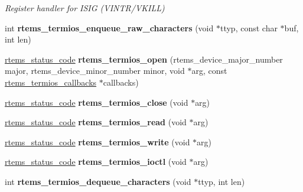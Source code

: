 \begin{DoxyCompactItemize}
\begin{DoxyCompactList}\small\item\em Register handler for I\+S\+IG (V\+I\+N\+T\+R/\+V\+K\+I\+LL) \end{DoxyCompactList}\item 
\mbox{\label{group__Termios_ga578fc70ca70d5cf49aebd7b75328e577}} 
int {\bfseries rtems\+\_\+termios\+\_\+enqueue\+\_\+raw\+\_\+characters} (void $\ast$ttyp, const char $\ast$buf, int len)
\item 
\mbox{\label{group__Termios_ga2f6eb2e1e2aee82f5030c1002d597785}} 
\mbox{\hyperlink{group__ClassicStatus_ga545d41846817eaba6143d52ee4d9e9fe}{rtems\+\_\+status\+\_\+code}} {\bfseries rtems\+\_\+termios\+\_\+open} (rtems\+\_\+device\+\_\+major\+\_\+number major, rtems\+\_\+device\+\_\+minor\+\_\+number minor, void $\ast$arg, const \mbox{\hyperlink{structrtems__termios__callbacks}{rtems\+\_\+termios\+\_\+callbacks}} $\ast$callbacks)
\item 
\mbox{\label{group__Termios_ga5df519920fbd677ea34eb11e2f332d88}} 
\mbox{\hyperlink{group__ClassicStatus_ga545d41846817eaba6143d52ee4d9e9fe}{rtems\+\_\+status\+\_\+code}} {\bfseries rtems\+\_\+termios\+\_\+close} (void $\ast$arg)
\item 
\mbox{\label{group__Termios_gaed46d58ba006e1f3cea47df1a479d9d9}} 
\mbox{\hyperlink{group__ClassicStatus_ga545d41846817eaba6143d52ee4d9e9fe}{rtems\+\_\+status\+\_\+code}} {\bfseries rtems\+\_\+termios\+\_\+read} (void $\ast$arg)
\item 
\mbox{\label{group__Termios_gad7b53fb199631aacfe771ccd9c14e06f}} 
\mbox{\hyperlink{group__ClassicStatus_ga545d41846817eaba6143d52ee4d9e9fe}{rtems\+\_\+status\+\_\+code}} {\bfseries rtems\+\_\+termios\+\_\+write} (void $\ast$arg)
\item 
\mbox{\label{group__Termios_ga73583d3b1a0974cdebef828e25e8ba3a}} 
\mbox{\hyperlink{group__ClassicStatus_ga545d41846817eaba6143d52ee4d9e9fe}{rtems\+\_\+status\+\_\+code}} {\bfseries rtems\+\_\+termios\+\_\+ioctl} (void $\ast$arg)
\item 
\mbox{\label{group__Termios_ga9d6c794f4b360479dcce4e61b61880f2}} 
int {\bfseries rtems\+\_\+termios\+\_\+dequeue\+\_\+characters} (void $\ast$ttyp, int len)
\end{DoxyCompactItemize}


